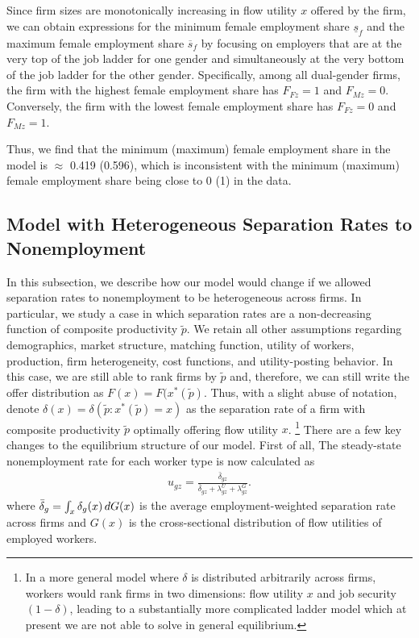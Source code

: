 %
Since firm sizes are monotonically increasing in flow utility $x$ offered by the firm, we can obtain expressions for the minimum female employment share $\underline{s}_{f}$ and the maximum female employment share $\overline{s}_{f}$ by focusing on employers that are at the very top of the job ladder for one gender and simultaneously at the very bottom of the job ladder for the other gender. Specifically, among all dual-gender firms, the firm with the highest female employment share has $F_{Fz} = 1$ and $F_{Mz} = 0$. Conversely, the firm with the lowest female employment share has $F_{Fz} = 0$ and $F_{Mz} = 1$.

Thus, we find that the minimum (maximum) female employment share in the model is $\approx$ 0.419 (0.596), which is inconsistent with the minimum (maximum) female employment share being close to 0 (1) in the data.


\subsection{Model with Heterogeneous Separation Rates to Nonemployment\label{app:hetero_delta_model}}

In this subsection, we describe how our model would change if we allowed separation rates to nonemployment to be heterogeneous across firms. In particular, we study a case in which  separation rates are a non-decreasing function of composite productivity $\tilde{p}$. We retain all other assumptions regarding demographics, market structure, matching function, utility of workers, production, firm heterogeneity, cost functions, and utility-posting behavior.
%
\newline\indent
%
In this case, we are still able to rank firms by $\tilde{p}$ and, therefore, we can still write the offer distribution as $F(x) = F(x^{*}(\tilde{p})$. Thus, with a slight abuse of notation, denote $\delta(x) = \delta(\tilde{p}: x^{*}(\tilde{p}) = x)$ as the separation rate of a firm with composite productivity $\tilde{p}$ optimally offering flow utility $x$.
\footnote{In a more general model where $\delta$ is distributed arbitrarily across firms, workers would rank firms in two dimensions: flow utility $x$ and job security $(1-\delta)$, leading to a substantially more complicated ladder model which at present we are not able to solve in general equilibrium.}
%
There are a few key changes to the equilibrium structure of our model. First of all,
The steady-state nonemployment rate for each worker type is now calculated as
%
\begin{align}
    u_{gz} = \frac{\bar{\delta}_{gz}}{\bar{\delta}_{gz} + \lambda_{gz}^{U} + \lambda_{gz}^{G}}. \label{eq:market_unemployment_hetdelta}
\end{align}
%
where $\bar{\delta}_{g} = \int_{x} \delta_{g}(x) \mathop{}\!{d} G(x)$ is the average employment-weighted separation rate across firms and $G(x)$ is the cross-sectional distribution of flow utilities of employed workers.

